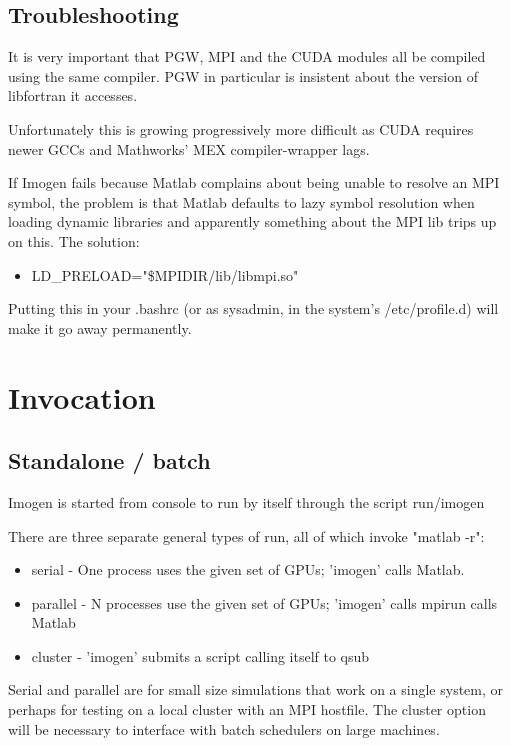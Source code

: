 \documentclass[letterpaper,12pt]{article}
\begin{document}
\subsection{Troubleshooting}

It is very important that PGW, MPI and the CUDA modules all be compiled
using the same compiler. PGW in particular is insistent about the version
of libfortran it accesses.

Unfortunately this is growing progressively more difficult as CUDA requires
newer GCCs and Mathworks' MEX compiler-wrapper lags.

If Imogen fails because Matlab complains about being unable to resolve an MPI
symbol, the problem is that Matlab defaults to lazy symbol resolution when
loading dynamic libraries and apparently something about the MPI lib trips
up on this. The solution:
\begin{itemize} \item LD\_PRELOAD="\$MPIDIR/lib/libmpi.so"
\end{itemize}
Putting this in your .bashrc (or as sysadmin, in the system's /etc/profile.d) will
make it go away permanently.

\section{Invocation}

\subsection{Standalone / batch}

Imogen is started from console to run by itself through the script run/imogen

There are three separate general types of run, all of which invoke "matlab -r":
\begin{itemize}
\item serial - One process uses the given set of GPUs; 'imogen' calls Matlab.
\item parallel - N processes use the given set of GPUs; 'imogen' calls mpirun calls Matlab
\item cluster - 'imogen' submits a script calling itself to qsub
\end{itemize}

Serial and parallel are for small size simulations that work on a single system,
or perhaps for testing on a local cluster with an MPI hostfile.
The cluster option will be necessary to interface with batch schedulers on large machines.
\end{document}
